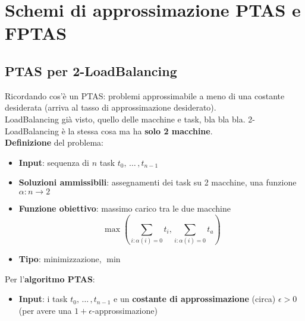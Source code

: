 \section{Schemi di approssimazione PTAS e FPTAS}
\subsection{PTAS per 2-LoadBalancing}

Ricordando cos'è un PTAS: problemi approssimabile a meno di una costante desiderata (arriva al tasso di approssimazione desiderato).\\

LoadBalancing già visto, quello delle macchine e task, bla bla bla. 2-LoadBalancing è la stessa cosa ma ha \textbf{solo 2 macchine}.\\

\textbf{Definizione} del problema:
\begin{itemize}
	\item \textbf{Input}: sequenza di $n$ task $t_0, \, \dots \, , t_{n-1}$
	\item \textbf{Soluzioni ammissibili}: assegnamenti dei task su 2 macchine, una funzione $\alpha: n \rightarrow 2$
	\item \textbf{Funzione obiettivo}: massimo carico tra le due macchine 
	$$ \max \left(\sum_{i: \alpha(i)=0} t_i , \sum_{i: \alpha(i)=0} t_a\right) $$
	\item \textbf{Tipo}: minimizzazione, $\min$
\end{itemize}

\nn

Per l'\textbf{algoritmo PTAS}: 
\begin{itemize}
	\item \textbf{Input}:  i task $t_0, \, \dots \, , t_{n-1}$ e un \textbf{costante di approssimazione} (circa) $\epsilon > 0$ (per avere una $1+\epsilon$-approssimazione)
\end{itemize}

\newpage

